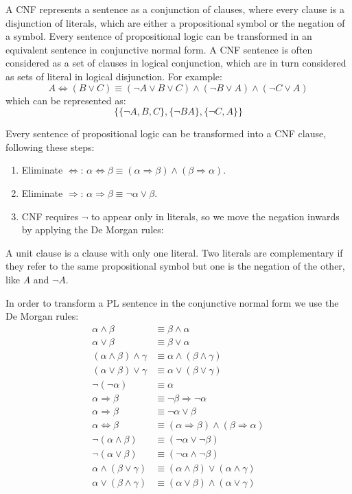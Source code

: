\documentclass{article}
\begin{document}
A CNF represents a sentence as a conjunction of clauses, where every clause is a disjunction of literals, which are either a propositional symbol or the negation of a symbol. Every sentence of propositional logic can be transformed in an equivalent sentence in conjunctive normal form. A CNF sentence is often considered as a set of clauses in logical conjunction, which are in turn considered as sets of literal in logical disjunction. For example:
    \[A\Leftrightarrow(B\lor C) \equiv (\neg A \lor B \lor C) \land (\neg B \lor A) \land (\neg C \lor A)\]
which can be represented as:
    \[\{\{\neg A, B, C\}, \{\neg B A\}, \{\neg C, A\}\}\]

Every sentence of propositional logic can be transformed into a CNF clause, following these steps:
\begin{enumerate}
    \item Eliminate \(\Leftrightarrow\): \(\alpha \Leftrightarrow \beta \equiv (\alpha \Rightarrow \beta) \land (\beta \Rightarrow \alpha)\).
    \item Eliminate \(\Rightarrow\): \(\alpha \Rightarrow \beta \equiv \neg \alpha \lor \beta\).
    \item CNF requires \(\neg\) to appear only in literals, so we move the negation inwards by applying the De Morgan rules:
    
\end{enumerate}

A unit clause is a clause with only one literal. Two literals are complementary if they refer to the same propositional symbol but one is the negation of the other, like \textit{A} and \(\neg A\).

In order to transform a PL sentence in the conjunctive normal form we use the De Morgan rules:
\begin{align*}
    \alpha \land \beta &\equiv \beta \land \alpha \\
    \alpha \lor \beta &\equiv \beta \lor \alpha \\
    (\alpha \land \beta)\land \gamma &\equiv \alpha \land (\beta \land \gamma) \\
    (\alpha \lor \beta)\lor \gamma &\equiv \alpha \lor (\beta \lor \gamma) \\
    \neg (\neg \alpha) &\equiv \alpha \\
    \alpha \Rightarrow \beta &\equiv \neg \beta \Rightarrow \neg \alpha \\
    \alpha \Rightarrow \beta &\equiv \neg \alpha \lor \beta \\
    \alpha\Leftrightarrow\beta &\equiv (\alpha\Rightarrow\beta) \land (\beta\Rightarrow\alpha) \\
    \neg (\alpha \land \beta) &\equiv (\neg \alpha \lor \neg \beta) \\
    \neg (\alpha \lor \beta) &\equiv (\neg \alpha \land \neg \beta) \\
    \alpha \land (\beta \lor \gamma) &\equiv (\alpha\land\beta)\lor(\alpha\land\gamma) \\
    \alpha \lor (\beta \land \gamma) &\equiv (\alpha \lor \beta)\land(\alpha \lor \gamma)
\end{align*}
\end{document}
